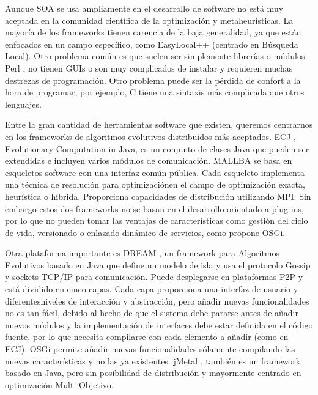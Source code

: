 \documentclass[runningheads]{llncs}
\begin{document}
Aunque SOA se usa ampliamente en el desarrollo de software no está muy aceptada en la comunidad científica de la optimización y metaheurísticas. La mayoría de los frameworks tienen carencia de la baja generalidad, ya que están enfocados en un campo específico, como EasyLocal++ \cite{EASYLOCAL}(centrado en Búsqueda Local). Otro problema común es que suelen ser simplemente librerías o múdulos Perl \cite{PERL}, no tienen GUIs o son muy complicados de instalar y requieren muchas destrezas de programación. Otro problema puede ser la pérdida de confort a la hora de programar, por ejemplo, C tiene una sintaxis más complicada que otros lenguajes.

Entre la gran cantidad de herramientas software que existen, queremos centrarnos en los frameworks de algoritmos evolutivos distribuídos más aceptados. ECJ \cite{ECJ}, Evolutionary Computation in Java, es un conjunto de clases Java que pueden ser extendidas e incluyen varios módulos de comunicación. MALLBA \cite{MALLBA} se basa en esqueletos software con una interfaz común pública. Cada esqueleto implementa una técnica de resolución para optimizaciónen el campo de optimización exacta, heurística o híbrida. Proporciona capacidades de distribución utilizando MPI. Sin embargo estos dos frameworks no se basan en el desarrollo orientado a plug-ins, por lo que no pueden tomar las ventajas de características como gestión del ciclo de vida, versionado o enlazado dinámico de servicios, como propone OSGi.

Otra plataforma importante es DREAM \cite{DREAM}, un framework para
Algoritmos Evolutivos basado en Java que define un modelo de isla y
usa el protocolo Gossip y sockets TCP/IP para comunicación. Puede
desplegarse en plataformas P2P y está dividido en cinco capas. Cada
capa proporciona una interfaz de usuario y diferentesniveles de
interacción y abstracción, pero añadir nuevas funcionalidades no es
tan fácil, debido al hecho de que el sistema debe pararse antes de
añadir nuevos módulos y la implementación de interfaces debe estar
definida en el código fuente, por lo que necesita compilarse con cada
elemento a añadir (como en ECJ). OSGi permite añadir nuevas
funcionalidades sólamente compilando las nuevas características y no
las ya existentes. jMetal \cite{JMETAL},  también es un framework
basado en Java, pero sin posibilidad de distribución y mayormente
centrado en optimización Multi-Objetivo. %
\end{document}
